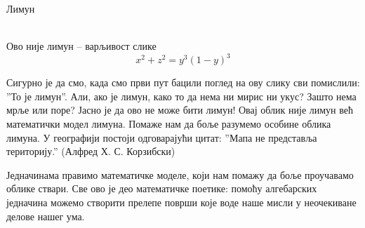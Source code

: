 \documentclass[sr]{./../../common/SurferDesc}%
\begin{document}
\footnotesize

\begin{surferPage}
  \begin{surferTitle} Лимун\end{surferTitle}  \\ %
Ово није лимун – варљивост слике\\
\smallskip
\[x^2 + z^2 = y^3 (1 - y)^3\] 


\singlespacing
Сигурно је да смо, када смо први пут бацили поглед на ову слику сви помислили: ''То је лимун''. Али, ако је лимун, како то да нема ни мирис ни укус? Зашто нема мрље или поре? Јасно је да ово не може бити лимун! 
\singlespacing
Овај облик није лимун већ математички модел лимуна. Помаже нам да боље разумемо особине облика лимуна. У географији постоји одговарајући цитат: ''Мапа не представља територију.'' (Алфред Х. С. Корзибски) \\
\singlespacing

Једначинама правимо математичке моделе, који нам помажу да боље проучавамо облике ствари. 
\singlespacing
Све ово је део математичке поетике: помоћу алгебарских једначина можемо створити прелепе површи које воде наше мисли у неочекиване делове нашег ума. 



  \begin{surferText}
     \end{surferText}
\end{surferPage}
\end{document}
